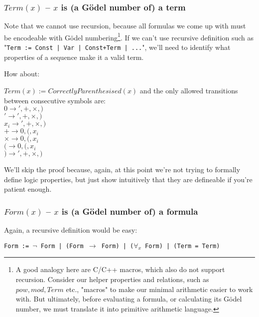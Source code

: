 \documentclass{article}
\begin{document}
\subsubsection{$Term(x)$ -- $x$ is (a Gödel number of) a term}

Note that we cannot use recursion, because all formulas
we come up with must be encodeable with Gödel numbering\footnote{
    A good analogy here are C/C++ macros, which also do not support recursion.
    Consider our helper properties and relations, such as $pow, mod, Term$ etc., "macros"
    to make our minimal arithmetic easier to work with. But ultimately, before evaluating
    a formula, or calculating its Gödel number, we must translate it into primitive
    arithmetic language.
}. If we can't use recursive definition such as "\texttt{Term := Const | Var | Const+Term | ...}",
we'll need to identify what properties of a sequence make it a valid term.

How about:
\begin{center}
    $Term(x) := CorrectlyParenthesised(x)$ and the only allowed transitions between consecutive
    symbols are: \\
    $0 \rightarrow ', +, \times, )$ \\
    $' \rightarrow ', +, \times, )$ \\
    $x_i \rightarrow ', +, \times, )$ \\
    $+ \rightarrow 0, (, x_i$ \\
    $\times \rightarrow 0, (, x_i$ \\
    $( \rightarrow 0, (, x_i $ \\
    $) \rightarrow ', +, \times, ) $ \\
\end{center}

We'll skip the proof because, again, at this point we're not trying to formally define
logic properties, but just show intuitively that they are defineable if you're patient enough.

\subsubsection{$Form(x)$ -- $x$ is (a Gödel number of) a formula}

Again, a recursive definition would be easy:

\begin{center}
    \texttt{Form := $\neg$ Form | (Form $\rightarrow$ Form) | ($\forall_x$ Form) | (Term = Term)}
\end{center}
\end{document}

